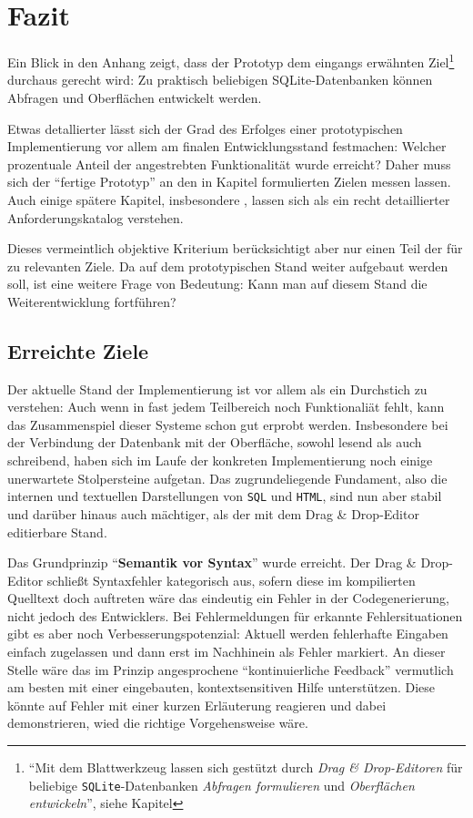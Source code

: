 \section{Fazit}
\label{sec:conclusion}

Ein Blick in den Anhang zeigt, dass der Prototyp dem eingangs erwähnten Ziel\footnote{"`Mit dem Blattwerkzeug lassen sich gestützt durch \textit{Drag \& Drop-Editoren} für beliebige \texttt{SQLite}-Datenbanken \textit{Abfragen formulieren} und \textit{Oberflächen entwickeln}"', siehe Kapitel } durchaus gerecht wird: Zu praktisch beliebigen SQLite-Datenbanken können Abfragen und Oberflächen entwickelt werden.

Etwas detallierter lässt sich der Grad des Erfolges einer prototypischen Implementierung vor allem am finalen Entwicklungsstand festmachen: Welcher prozentuale Anteil der angestrebten Funktionalität wurde erreicht? Daher muss sich der "`fertige Prototyp"' an den in Kapitel  formulierten Zielen messen lassen. Auch einige spätere Kapitel, insbesondere , lassen sich als ein recht detaillierter Anforderungskatalog verstehen.

Dieses vermeintlich objektive Kriterium berücksichtigt aber nur einen Teil der für \idename{} zu relevanten Ziele. Da auf dem prototypischen Stand weiter aufgebaut werden soll, ist eine weitere Frage von Bedeutung: Kann man auf diesem Stand die Weiterentwicklung fortführen?

\subsection{Erreichte Ziele}

Der aktuelle Stand der Implementierung ist vor allem als ein Durchstich zu verstehen: Auch wenn in fast jedem Teilbereich noch Funktionaliät fehlt, kann das Zusammenspiel dieser Systeme schon gut erprobt werden. Insbesondere bei der Verbindung der Datenbank mit der Oberfläche, sowohl lesend als auch schreibend, haben sich im Laufe der konkreten Implementierung noch einige unerwartete Stolpersteine aufgetan. Das zugrundeliegende Fundament, also die internen und textuellen Darstellungen von \texttt{SQL} und \texttt{HTML}, sind nun aber stabil und darüber hinaus auch mächtiger, als der mit dem Drag \& Drop-Editor editierbare Stand.

Das Grundprinzip "`\textbf{Semantik vor Syntax}"' wurde erreicht. Der Drag \& Drop-Editor schließt Syntaxfehler kategorisch aus, sofern diese im kompilierten Quelltext doch auftreten wäre das eindeutig ein Fehler in der Codegenerierung, nicht jedoch des Entwicklers. Bei Fehlermeldungen für erkannte Fehlersituationen gibt es aber noch Verbesserungspotenzial: Aktuell werden fehlerhafte Eingaben einfach zugelassen und dann erst im Nachhinein als Fehler markiert. An dieser Stelle wäre das im Prinzip angesprochene "`kontinuierliche Feedback"' vermutlich am besten mit einer eingebauten, kontextsensitiven Hilfe unterstützen. Diese könnte auf Fehler mit einer kurzen Erläuterung reagieren und dabei demonstrieren, wied die richtige Vorgehensweise wäre.

